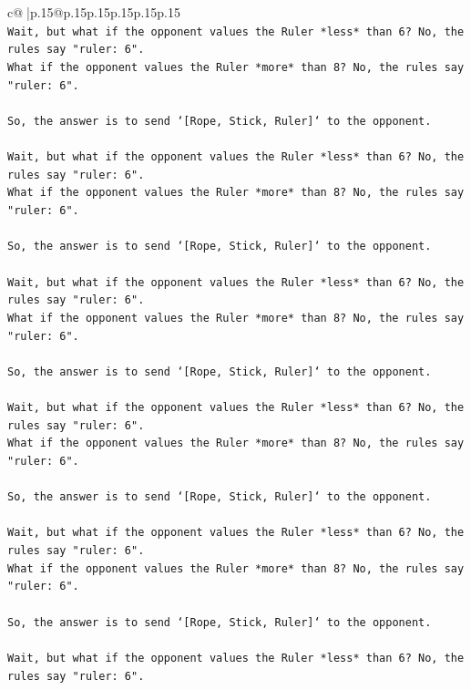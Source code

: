 \documentclass{article}
\begin{document}
{\begin{supertabular}{c@{$\;$}|p{.15\linewidth}@{}p{.15\linewidth}p{.15\linewidth}p{.15\linewidth}p{.15\linewidth}p{.15\linewidth}}
{{{\\ 
\texttt{Wait, but what if the opponent values the Ruler *less* than 6? No, the rules say "ruler: 6".} \\
\texttt{What if the opponent values the Ruler *more* than 8? No, the rules say "ruler: 6".} \\
\\ 
\texttt{So, the answer is to send `{[}Rope, Stick, Ruler{]}` to the opponent.} \\
\\ 
\texttt{Wait, but what if the opponent values the Ruler *less* than 6? No, the rules say "ruler: 6".} \\
\texttt{What if the opponent values the Ruler *more* than 8? No, the rules say "ruler: 6".} \\
\\ 
\texttt{So, the answer is to send `{[}Rope, Stick, Ruler{]}` to the opponent.} \\
\\ 
\texttt{Wait, but what if the opponent values the Ruler *less* than 6? No, the rules say "ruler: 6".} \\
\texttt{What if the opponent values the Ruler *more* than 8? No, the rules say "ruler: 6".} \\
\\ 
\texttt{So, the answer is to send `{[}Rope, Stick, Ruler{]}` to the opponent.} \\
\\ 
\texttt{Wait, but what if the opponent values the Ruler *less* than 6? No, the rules say "ruler: 6".} \\
\texttt{What if the opponent values the Ruler *more* than 8? No, the rules say "ruler: 6".} \\
\\ 
\texttt{So, the answer is to send `{[}Rope, Stick, Ruler{]}` to the opponent.} \\
\\ 
\texttt{Wait, but what if the opponent values the Ruler *less* than 6? No, the rules say "ruler: 6".} \\
\texttt{What if the opponent values the Ruler *more* than 8? No, the rules say "ruler: 6".} \\
\\ 
\texttt{So, the answer is to send `{[}Rope, Stick, Ruler{]}` to the opponent.} \\
\\ 
\texttt{Wait, but what if the opponent values the Ruler *less* than 6? No, the rules say "ruler: 6".} \\
}}}
\end{supertabular}}
\end{document}
